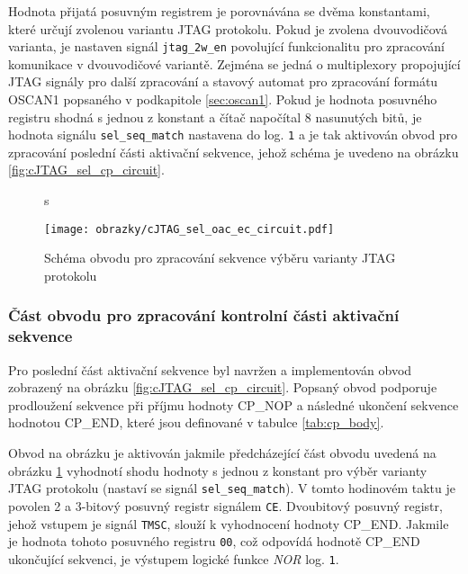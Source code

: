 Hodnota přijatá posuvným registrem je porovnávána se dvěma konstantami, které určují zvolenou variantu \acs{JTAG} protokolu. Pokud je zvolena dvouvodičová varianta, je nastaven signál \texttt{jtag\_2w\_en} povolující funkcionalitu pro zpracování komunikace v dvouvodičové variantě. Zejména se jedná o multiplexory propojující \acs{JTAG} signály pro další zpracování a stavový automat pro  zpracování formátu OSCAN1 popsaného v podkapitole \ref{sec:oscan1}. Pokud je hodnota posuvného registru shodná s jednou z konstant a čítač napočítal 8 nasunutých bitů, je hodnota signálu \texttt{sel\_seq\_match} nastavena do log. \texttt{1} a je tak aktivován obvod pro zpracování poslední části aktivační sekvence, jehož schéma je uvedeno na obrázku \ref{fig:cJTAG_sel_cp_circuit}. 

\begin{figure}[H]s
  \begin{center}
    \texttt{[image: obrazky/cJTAG\_sel\_oac\_ec\_circuit.pdf]}
  \end{center}
  \caption{Schéma obvodu pro zpracování sekvence výběru varianty \acs{JTAG} protokolu}
	\label{fig:cJTAG_sel_oac_ec_circuit}
\end{figure}

\subsubsection{Část obvodu pro zpracování kontrolní části aktivační sekvence}
Pro poslední část aktivační sekvence byl navržen a implementován obvod zobrazený na obrázku \ref{fig:cJTAG_sel_cp_circuit}. Popsaný obvod podporuje prodloužení sekvence při příjmu hodnoty CP\_NOP a následné ukončení sekvence hodnotou CP\_END, které jsou definované v tabulce \ref{tab:cp_body}. %

Obvod na obrázku je aktivován jakmile předcházející část obvodu uvedená na obrázku \ref{fig:cJTAG_sel_oac_ec_circuit} vyhodnotí shodu hodnoty s jednou z konstant pro výběr varianty \acs{JTAG} protokolu (nastaví se signál \texttt{sel\_seq\_match}). V tomto hodinovém taktu je povolen 2 a 3-bitový posuvný registr signálem \texttt{CE}. Dvoubitový posuvný registr, jehož vstupem je signál \texttt{\acs{TMSC}}, slouží k vyhodnocení hodnoty CP\_END. Jakmile je hodnota tohoto posuvného registru \texttt{00}, což odpovídá hodnotě CP\_END ukončující sekvenci, je výstupem logické funkce \textit{NOR} log. \texttt{1}.


